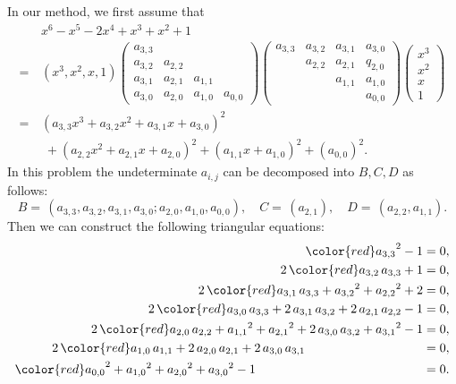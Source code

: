 \documentclass[runningheads]{llncs}
\begin{document}
In our method, we first assume that
\begin{align*}
&x^6-x^5-2x^4+x^3+x^2+1\\
=\,&
\left(x^3,x^2,x,1\right)
\left(\begin{array}{cccc}
a_{3,3}&&&\\
a_{3,2}&a_{2,2}&&\\
a_{3,1}&a_{2,1}&a_{1,1}&\\
a_{3,0}&a_{2,0}&a_{1,0}&a_{0,0}
\end{array}\right)
\left(\begin{array}{cccc}
a_{3,3}&a_{3,2}&a_{3,1}&a_{3,0}\\
&a_{2,2}&a_{2,1}&q_{2,0}\\
&&a_{1,1}&a_{1,0}\\
&&&a_{0,0}
\end{array}\right)
\left(\begin{array}{c}
x^3\\x^2\\x\\1
\end{array}\right)\\
=\,&\left(a_{3,3}x^3+a_{3,2}x^2+a_{3,1}x+a_{3,0}\right)^2\\
&\;
+\left(a_{2,2}x^2+a_{2,1}x+a_{2,0}\right)^2
+\left(a_{1,1}x+a_{1,0}\right)^2
+\left(a_{0,0}\right)^2.
\end{align*}
In this problem the undeterminate $a_{i,j}$ can be decomposed into $B,C,D$ as follows:
$$
B=\,\left(a_{3,3},a_{3,2},a_{3,1},a_{3,0}; a_{2,0},a_{1,0},a_{0,0}\right),\quad
C=\,\left(a_{2,1}\right), \quad 
D=\,\left(a_{2,2},a_{1,1}\right).
$$
Then we can construct the following triangular equations:
\begin{align}
{{\color{red} a_{3,3}}}^{2}-1=0,\nonumber \\
2\,{\color{red} a_{3,2}}\,{ a_{3,3}}+1=0,\nonumber \\
2\,{\color{red} a_{3,1}}\,{ a_{3,3}}+{{ a_{3,2}}}^{2}+{{ a_{2,2}}}^{2}+2=0,\nonumber \\
2\,{\color{red} a_{3,0}}\,{ a_{3,3}}+2\,{ a_{3,1}}\,{ a_{3,2}}+2\,{ a_{2,1}}\,{ a_{2,2}}-1=0,\nonumber \\
2\,{\color{red} a_{2,0}}\,{ a_{2,2}}+{{ a_{1,1}}}^{2}+{{ a_{2,1}}}^{2}+2\,{ a_{3,0}}\,{ a_{3,2}}+{{ a_{3,1}}}^{2}-1=0,\nonumber \\
2\,{\color{red} a_{1,0}}\,{ a_{1,1}}+2\,{ a_{2,0}}\,{ a_{2,1}}+2\,{ a_{3,0}}\,{ a_{3,1}}\phantom{space here for purpose}=0,\nonumber \\
{{\color{red} a_{0,0}}}^{2}+{{ a_{1,0}}}^{2}+{{ a_{2,0}}}^{2}+{{ a_{3,0}}}^{2}-1\phantom{please don't delete the space here}=0.\nonumber \\
\label{the-eqs7}
\end{align}
\end{document}
